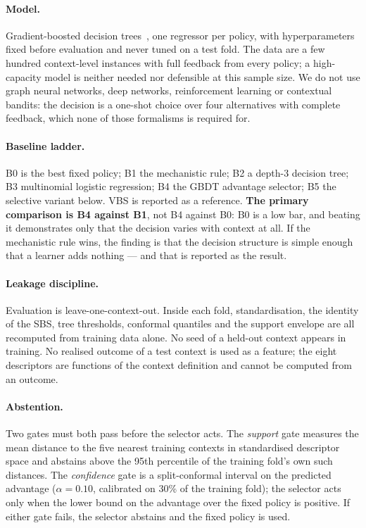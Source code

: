 \paragraph{Model.} Gradient-boosted decision
trees~\cite{friedman2001gbm,ke2017lightgbm}, one regressor per policy, with
hyperparameters fixed before evaluation and never tuned on a test fold. The
data are a few hundred context-level instances with full feedback from every
policy; a high-capacity model is neither needed nor defensible at this sample
size. We do not use graph neural networks, deep networks, reinforcement
learning or contextual bandits: the decision is a one-shot choice over four
alternatives with complete feedback, which none of those formalisms is required
for.

\paragraph{Baseline ladder.} B0 is the best fixed policy; B1 the mechanistic
rule; B2 a depth-3 decision tree; B3 multinomial logistic regression; B4 the
GBDT advantage selector; B5 the selective variant below. VBS is reported as a
reference. \textbf{The primary comparison is B4 against B1}, not B4 against
B0: B0 is a low bar, and beating it demonstrates only that the decision varies
with context at all. If the mechanistic rule wins, the finding is that the
decision structure is simple enough that a learner adds nothing --- and that is
reported as the result.

\paragraph{Leakage discipline.} Evaluation is leave-one-context-out. Inside
each fold, standardisation, the identity of the SBS, tree thresholds,
conformal quantiles and the support envelope are all recomputed from training
data alone. No seed of a held-out context appears in training. No realised
outcome of a test context is used as a feature; the eight descriptors are
functions of the context definition and cannot be computed from an outcome.

\paragraph{Abstention.} Two gates must both pass before the selector acts.
The \emph{support} gate measures the mean distance to the five nearest training
contexts in standardised descriptor space and abstains above the 95th
percentile of the training fold's own such distances. The \emph{confidence}
gate is a split-conformal interval on the predicted advantage
($\alpha=0.10$, calibrated on 30\% of the training fold); the selector acts only
when the lower bound on the advantage over the fixed policy is positive. If
either gate fails, the selector abstains and the fixed policy is used.

